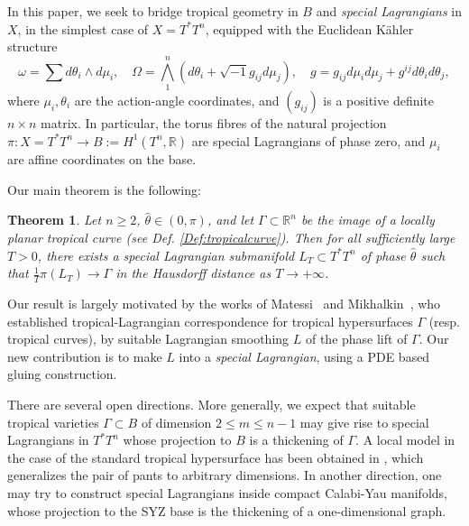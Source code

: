 \documentclass{article}
\newtheorem{thm}{Theorem}[section]
\theoremstyle{definition}
\begin{document}
    In this paper, we seek to bridge tropical geometry in $B$ and \emph{special Lagrangians} in $X$, in the simplest case of $X=T^*T^n$, equipped with the Euclidean K\"ahler structure
\[
\omega=\sum d\theta_i\wedge d\mu_i, \quad \Omega= \bigwedge_1^n (d\theta_i+ \sqrt{-1} g_{ij} d\mu_j), \quad g=g_{ij} d\mu_id\mu_j+ g^{ij} d\theta_id\theta_j,
\]
where $\mu_i, \theta_i$ are the action-angle coordinates, and $(g_{ij})$ is a positive definite $n\times n$ matrix. 
In particular, the torus fibres of the natural projection $\pi: X=T^*T^n\to B:= H^1(T^n,\mathbb{R})$ are special Lagrangians of phase zero, and $\mu_i$ are affine coordinates on the base.     
    
    
    
   
 
 
 
 
 
 
 
 Our main theorem is the following:
    
	\begin{thm}\label{thm:tropical}
      Let $n \ge 2$, $\hat{\theta}\in (0,\pi)$, and let $\Gamma \subset \mathbb{R}^n$ be the image of a locally planar tropical curve (see Def. \ref{Def:tropicalcurve}).  Then for all sufficiently large $T > 0$, there exists a special Lagrangian submanifold $ L_T \subset T^*T^n$ of phase $\hat\theta$ such that $\frac{1}{T}\pi(L_T) \longrightarrow \Gamma$ in the Hausdorff distance as $T \to +\infty$.
    \end{thm}
    
    Our result is largely motivated by the works of Matessi~\cite{Matessi21} and Mikhalkin~\cite{Mikhalkin19}, who established tropical-Lagrangian correspondence for tropical hypersurfaces $\Gamma$ (resp. tropical curves), by suitable Lagrangian smoothing $L$ of the phase lift of $\Gamma$. Our new contribution is to make $L$ into a \emph{special Lagrangian}, using a PDE based gluing construction. 
    
    
    
    
    There are several open directions. 
    More generally, we expect that suitable tropical varieties $\Gamma\subset B$ of dimension $2\leq m\leq n-1$ may give rise to special Lagrangians in $T^*T^n$ whose projection to $B$ is a thickening of $\Gamma$. A local model in the case of the standard tropical hypersurface has been obtained in \cite{specialLagpairofpants}, which generalizes the pair of pants to arbitrary dimensions. In another direction, one may try to construct special Lagrangians inside compact Calabi-Yau manifolds, whose projection to the SYZ base is the thickening of a one-dimensional graph. 
\end{document}
